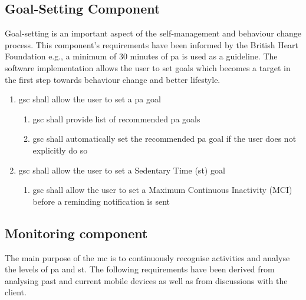     \subsection{Goal-Setting Component}
    \label{section-goal-setting-component}
    Goal-setting is an important aspect of the self-management and behaviour change process. This component's requirements have been informed by the British Heart Foundation \citep[14]{townsend2015} e.g., a minimum of 30 minutes of \gls{pa} is used as a guideline. The software implementation allows the user to set goals which becomes a target in the first step towards behaviour change and better lifestyle.
    
    \begin{enumerate}
        \item \gls{gsc} shall allow the user to set a \gls{pa} goal
        \begin{enumerate}
            \item \gls{gsc} shall provide list of recommended \gls{pa} goals
            \item \gls{gsc} shall automatically set the recommended \gls{pa} goal if the user does not explicitly do so 
        \end{enumerate}
        \item \gls{gsc} shall allow the user to set a Sedentary Time (\gls{st}) goal
        \begin{enumerate}
            \item \gls{gsc} shall allow the user to set a Maximum Continuous Inactivity (MCI) before a reminding notification is sent 
        \end{enumerate}
    \end{enumerate}
    
    
    \subsection{Monitoring component}
    \label{subsection:monitoring-component}
    The main purpose of the \gls{mc} is to continuously recognise activities and analyse the levels of \gls{pa} and \gls{st}. The following requirements have been derived from analysing past and current mobile devices as well as from discussions with the client.
    
